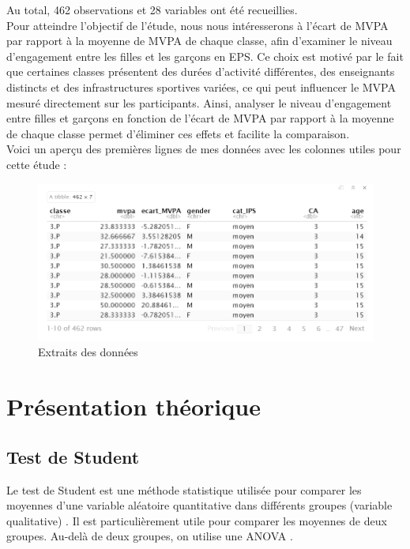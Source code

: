 \documentclass[12pt,a4paper]{article}
\begin{document}
	Au total, 462 observations et 28 variables ont été recueillies.\\
	Pour atteindre l'objectif de l'étude, nous nous intéresserons à l'écart de MVPA par rapport à la moyenne de MVPA de chaque classe, afin d'examiner le niveau d'engagement entre les filles et les garçons en EPS. Ce choix est motivé par le fait que certaines classes présentent des durées d'activité différentes, des enseignants distincts et des infrastructures sportives variées, ce qui peut influencer le MVPA mesuré directement sur les participants. Ainsi, analyser le niveau d'engagement entre filles et garçons en fonction de l'écart de MVPA par rapport à la moyenne de chaque classe permet d'éliminer ces effets et facilite la comparaison.\\
	
	Voici un aperçu des premières lignes de mes données avec les colonnes utiles pour cette étude : 
	
	\begin{figure}[H]
		\centering
		\includegraphics[width=\linewidth]{Extrai_donnée.PNG}
		\caption{Extraits des données}
		\label{fig:image1}
	\end{figure}


	
	
	\newpage
	\section{Présentation théorique}
	\subsection{Test de Student}
	Le test de Student est une méthode statistique utilisée pour comparer les moyennes d’une variable aléatoire quantitative
	dans différents groupes (variable qualitative) \cite{poulin2023}. Il est particulièrement utile pour comparer les moyennes de deux groupes. Au-delà de deux groupes, on utilise une ANOVA \cite{poulin2023}.
	
\end{document}
